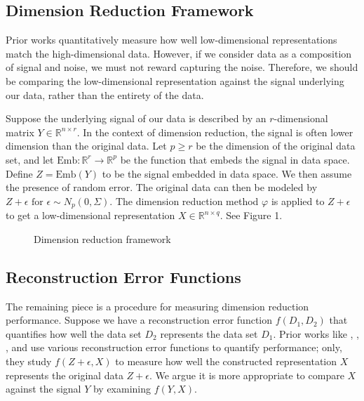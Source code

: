 \documentclass{article}
\begin{document}
\subsection{Dimension Reduction Framework}
Prior works quantitatively measure how well low-dimensional representations match the high-dimensional data. However, if we consider data as a composition of signal and noise, we must not reward capturing the noise. Therefore, we should be comparing the low-dimensional representation against the signal underlying our data, rather than the entirety of the data.

Suppose the underlying signal of our data is described by an $r$-dimensional matrix $Y \in \mathbb{R}^{n \times r}$. In the context of dimension reduction, the signal is often lower dimension than the original data. Let $p \geq r$ be the dimension of the original data set, and let $\textrm{Emb}:\mathbb{R}^r \to \mathbb{R}^p$ be the function that embeds the signal in data space. Define $Z = \textrm{Emb}(Y)$ to be the signal embedded in data space. We then assume the presence of random error. The original data can then be modeled by $Z + \epsilon \textrm{ for } \epsilon \sim N_p(0, \Sigma)$. The dimension reduction method $\varphi$ is applied to $Z + \epsilon$ to get a low-dimensional representation $X \in \mathbb{R}^{n \times q}$. See Figure 1.

\renewcommand{\thefigure}{1}
\begin{figure}[H]
\centering
{}
\caption{Dimension reduction framework}
\end{figure}

\subsection{Reconstruction Error Functions}
The remaining piece is a procedure for measuring dimension reduction performance. Suppose we have a reconstruction error function $f(D_1, D_2)$ that quantifies how well the data set $D_2$ represents the data set $D_1$. Prior works like \cite{evaluation of DR transcriptomics}, \cite{t-SNE cell} , \cite{large DR unreliable}, and \cite{quantitative survey} use various reconstruction error functions to quantify performance; only, they study $f(Z + \epsilon, X)$ to measure how well the constructed representation $X$ represents the original data $Z + \epsilon$. We argue it is more appropriate to compare $X$ against the signal $Y$ by examining $f(Y, X)$.
\end{document}
